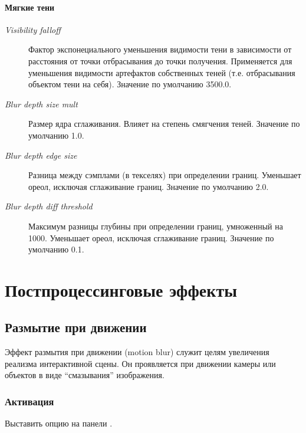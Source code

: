 \documentclass[a4paper,12pt,oneside]{sphinxmanual}
\begin{document}
\subsubsection{Мягкие тени}
\label{lighting:id12}\begin{description}
\item[{\emph{Visibility falloff}}] \leavevmode
Фактор экспонециального уменьшения видимости тени в зависимости от расстояния от точки отбрасывания до точки получения. Применяется для уменьшения видимости артефактов собственных теней (т.е. отбрасывания объектом тени на себя). Значение по умолчанию 3500.0.

\item[{\emph{Blur depth size mult}}] \leavevmode
Размер ядра сглаживания. Влияет на степень смягчения теней. Значение по умолчанию 1.0.

\item[{\emph{Blur depth edge size}}] \leavevmode
Разница между сэмплами (в текселях) при определении границ. Уменьшает ореол, исключая сглаживание границ. Значение по умолчанию 2.0.

\item[{\emph{Blur depth diff threshold}}] \leavevmode
Максимум разницы глубины при определении границ, умноженный на 1000. Уменьшает ореол, исключая сглаживание границ. Значение по умолчанию 0.1.

\end{description}


\chapter{Постпроцессинговые эффекты}
\label{postprocessing_effects:postprocessing-effects}\label{postprocessing_effects::doc}\label{postprocessing_effects:id1}

\section{Размытие при движении}
\label{postprocessing_effects:id2}\label{postprocessing_effects:motion-blur}\label{postprocessing_effects:index-0}
Эффект размытия при движении (motion blur) служит целям увеличения реализма интерактивной сцены. Он проявляется при движении камеры или объектов в виде ``смазывания'' изображения.


\subsection{Активация}
\label{postprocessing_effects:id3}
Выставить опцию  на панели .
\end{document}
